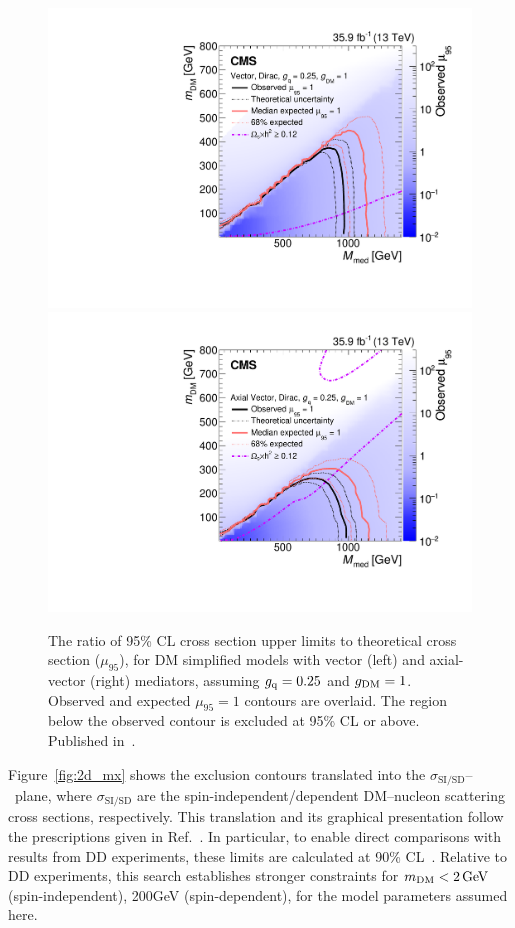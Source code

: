 \begin{figure}[htbp]
  \begin{center}
   \includegraphics[width=0.48\linewidth]{figures/exo16053/Figure_007-a.pdf}
    \includegraphics[width=0.48\linewidth]{figures/exo16053/Figure_007-b.pdf}
    \caption{
      The ratio of 95\% CL cross section upper limits to theoretical cross section ($\mu_{95}$), for DM simplified models with vector (left) and axial-vector
      (right) mediators, assuming $\gq=0.25$ and $\gdm=1$. Observed and expected $\mu_{95} = 1$ contours are overlaid.
      The region below the observed contour is excluded at 95\% CL or above. Published in~\cite{ref:JHEP02(2019)074}.
    }
    \label{fig:2d_mm}
  \end{center}
\end{figure}

Figure~\ref{fig:2d_mx} shows the exclusion contours translated into the
$\sigma_{\text{SI/SD}}$--\mdm\ plane, where $\sigma_{\text{SI/SD}}$ are the
spin-independent/dependent DM--nucleon scattering cross sections, respectively.
This translation and its graphical presentation follow the prescriptions given in Ref.~\cite{ref:1603.04156}.
In particular, to enable direct comparisons with results
from DD experiments, these limits are calculated at 90\% CL~\cite{ref:1507.00966}.
Relative to DD experiments, this search establishes stronger constraints for $\mdm < 2\unit{GeV}$ (spin-independent), 200\unit{GeV}
(spin-dependent), for the model parameters assumed here.

